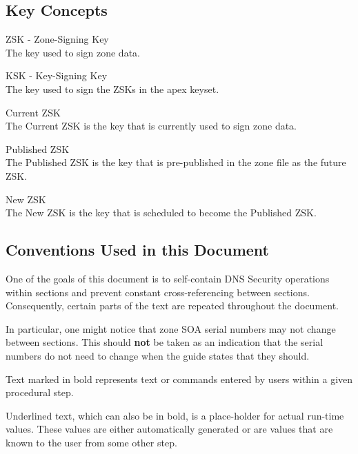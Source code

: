 \subsection{Key Concepts}
\begin{description}
\item{ZSK} - Zone-Signing Key\\
The key used to sign zone data.

\item{KSK} - Key-Signing Key\\
The key used to sign the ZSKs in the apex keyset.

\item{Current ZSK}\\
The Current ZSK is the key that is currently used to sign zone data.

\item{Published ZSK}\\
The Published ZSK is the key that is pre-published in the zone file as the
future ZSK.

\item{New ZSK}\\
The New ZSK is the key that is scheduled to become the Published ZSK.

\end{description}


\subsection{Conventions Used in this Document}

One of the goals of this document is to self-contain DNS Security
operations within sections and prevent constant cross-referencing between
sections.  Consequently, certain parts of the text are repeated throughout
the document.

In particular, one might notice that zone SOA serial numbers may not change
between sections.  This should {\bf not} be taken as an indication that the
serial numbers do not need to change when the guide states that they should.

Text marked in bold represents text or commands entered by users
within a given procedural step.

Underlined text, which can also be in bold, is a place-holder for actual
run-time values.  These values are either automatically generated or are
values that are known to the user from some other step.

